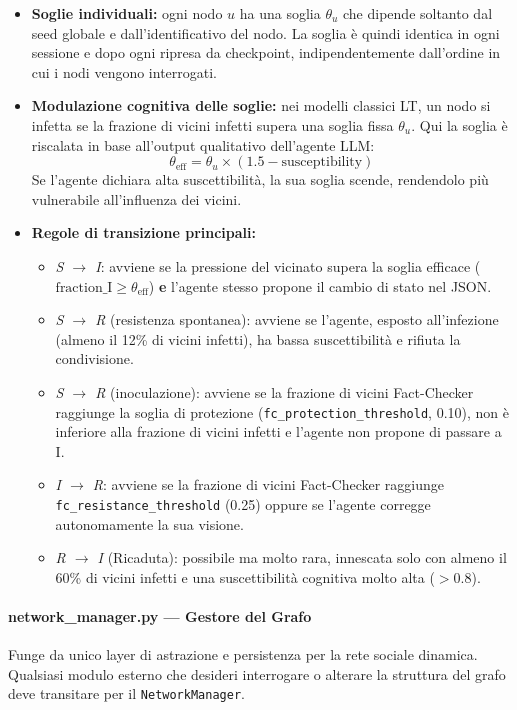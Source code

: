 \documentclass[11pt, a4paper]{article}
\begin{document}
\begin{itemize}[leftmargin=*]
    \item \textbf{Soglie individuali:} ogni nodo $u$ ha una soglia $\theta_u$ che dipende soltanto dal seed globale e dall'identificativo del nodo. La soglia è quindi identica in ogni sessione e dopo ogni ripresa da checkpoint, indipendentemente dall'ordine in cui i nodi vengono interrogati.
    \item \textbf{Modulazione cognitiva delle soglie:} nei modelli classici LT, un nodo si infetta se la frazione di vicini infetti supera una soglia fissa $\theta_u$. Qui la soglia è riscalata in base all'output qualitativo dell'agente LLM:
    \[
        \theta_{\text{eff}} = \theta_u \times (1.5 - \text{susceptibility})
    \]
    Se l'agente dichiara alta suscettibilità, la sua soglia scende, rendendolo più vulnerabile all'influenza dei vicini.
    \item \textbf{Regole di transizione principali:}
    \begin{itemize}
        \item \textit{S $\to$ I}: avviene se la pressione del vicinato supera la soglia efficace ($\text{fraction\_I} \ge \theta_{\text{eff}}$) \textbf{e} l'agente stesso propone il cambio di stato nel JSON.
        \item \textit{S $\to$ R} (resistenza spontanea): avviene se l'agente, esposto all'infezione (almeno il 12\% di vicini infetti), ha bassa suscettibilità e rifiuta la condivisione.
        \item \textit{S $\to$ R} (inoculazione): avviene se la frazione di vicini Fact-Checker raggiunge la soglia di protezione (\texttt{fc\_protection\_threshold}, 0.10), non è inferiore alla frazione di vicini infetti e l'agente non propone di passare a I.
        \item \textit{I $\to$ R}: avviene se la frazione di vicini Fact-Checker raggiunge \texttt{fc\_resistance\_threshold} (0.25) oppure se l'agente corregge autonomamente la sua visione.
        \item \textit{R $\to$ I} (Ricaduta): possibile ma molto rara, innescata solo con almeno il 60\% di vicini infetti e una suscettibilità cognitiva molto alta ($>0.8$).
    \end{itemize}
\end{itemize}

\paragraph{network\_manager.py — Gestore del Grafo}
Funge da unico layer di astrazione e persistenza per la rete sociale dinamica. Qualsiasi modulo esterno che desideri interrogare o alterare la struttura del grafo deve transitare per il \texttt{NetworkManager}.
\end{document}
